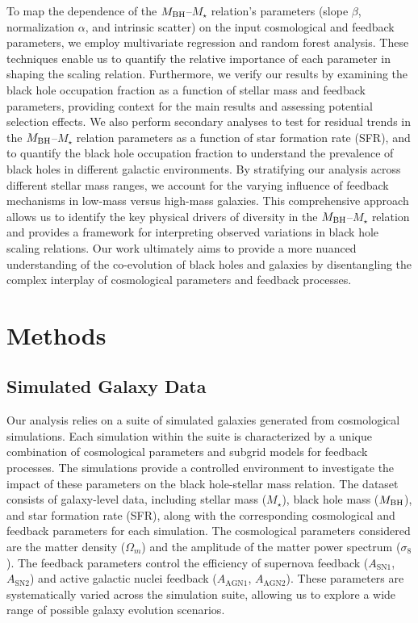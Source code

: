 \documentclass[twocolumn]{aastex631}
\begin{document}
To map the dependence of the $M_{\rm BH}$--$M_{\star}$ relation's parameters (slope $\beta$, normalization $\alpha$, and intrinsic scatter) on the input cosmological and feedback parameters, we employ multivariate regression and random forest analysis. These techniques enable us to quantify the relative importance of each parameter in shaping the scaling relation. Furthermore, we verify our results by examining the black hole occupation fraction as a function of stellar mass and feedback parameters, providing context for the main results and assessing potential selection effects. We also perform secondary analyses to test for residual trends in the $M_{\rm BH}$--$M_{\star}$ relation parameters as a function of star formation rate (SFR), and to quantify the black hole occupation fraction to understand the prevalence of black holes in different galactic environments. By stratifying our analysis across different stellar mass ranges, we account for the varying influence of feedback mechanisms in low-mass versus high-mass galaxies. This comprehensive approach allows us to identify the key physical drivers of diversity in the $M_{\rm BH}$--$M_{\star}$ relation and provides a framework for interpreting observed variations in black hole scaling relations. Our work ultimately aims to provide a more nuanced understanding of the co-evolution of black holes and galaxies by disentangling the complex interplay of cosmological parameters and feedback processes.

\section{Methods}
\label{sec:methods}
\subsection{Simulated Galaxy Data}

Our analysis relies on a suite of simulated galaxies generated from cosmological simulations. Each simulation within the suite is characterized by a unique combination of cosmological parameters and subgrid models for feedback processes. The simulations provide a controlled environment to investigate the impact of these parameters on the black hole-stellar mass relation. The dataset consists of galaxy-level data, including stellar mass ($M_{\star}$), black hole mass ($M_{\rm BH}$), and star formation rate (SFR), along with the corresponding cosmological and feedback parameters for each simulation. The cosmological parameters considered are the matter density ($\Omega_m$) and the amplitude of the matter power spectrum ($\sigma_8$). The feedback parameters control the efficiency of supernova feedback ($A_\mathrm{SN1}$, $A_\mathrm{SN2}$) and active galactic nuclei feedback ($A_\mathrm{AGN1}$, $A_\mathrm{AGN2}$). These parameters are systematically varied across the simulation suite, allowing us to explore a wide range of possible galaxy evolution scenarios.
\end{document}
